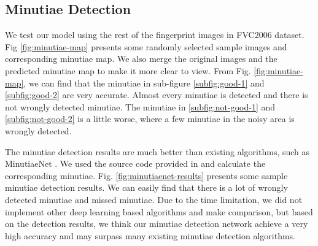 \subsection{Minutiae Detection}

We test our model using the rest of the fingerprint images in FVC2006 dataset.
Fig \ref{fig:minutiae-map} presents some randomly selected sample images and corresponding minutiae map.
We also merge the original images and the predicted minutiae map to make it more clear to view.
From Fig. \ref{fig:minutiae-map}, we can find that the minutiae in sub-figure \ref{subfig:good-1} and \ref{subfig:good-2} are very accurate.
Almost every minutiae is detected and there is not wrongly detected minutiae.
The minutiae in \ref{subfig:not-good-1} and \ref{subfig:not-good-2} is a little worse, where a few minutiae in the noisy area is wrongly detected.

The minutiae detection results are much better than existing algorithms, such as MinutiaeNet \cite{NguyenICB2018}.
We used the source code provided in \cite{NguyenICB2018} and calculate the corresponding minutiae.
Fig. \ref{fig:minutiaenet-results} presents some sample minutiae detection results.
We can easily find that there is a lot of wrongly detected minutiae and missed minutiae.
Due to the time limitation, we did not implement other deep learning based algorithms and make comparison, but based on the detection results, we think our minutiae detection network achieve a very high accuracy and may surpass many existing minutiae detection algorithms.

